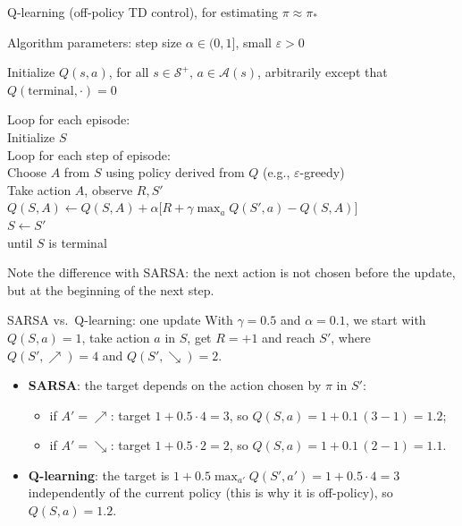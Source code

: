\begin{algobox}{Q-learning (off-policy TD control), for estimating $\pi \approx \pi_*$}
\raggedright
Algorithm parameters: step size $\alpha \in (0,1]$, small $\varepsilon > 0$

\medskip
Initialize $Q(s,a)$, for all $s \in \mathcal{S}^+,\, a \in \mathcal{A}(s)$, arbitrarily except that $Q(\text{terminal},\cdot) = 0$

\medskip
Loop for each episode:\\
\hspace*{1.5em}Initialize $S$\\
\hspace*{1.5em}Loop for each step of episode:\\
\hspace*{3em}Choose $A$ from $S$ using policy derived from $Q$ (e.g., $\varepsilon$-greedy)\\
\hspace*{3em}Take action $A$, observe $R, S'$\\
\hspace*{3em}$Q(S,A) \leftarrow Q(S,A) + \alpha \bigl[R + \gamma \max_a Q(S',a) - Q(S,A)\bigr]$\\
\hspace*{3em}$S \leftarrow S'$\\
\hspace*{1.5em}until $S$ is terminal
\end{algobox}
Note the difference with SARSA: the next action is not chosen before the update, but at the beginning of the next step.

\begin{esempio}{SARSA vs.\ Q-learning: one update}
With $\gamma=0.5$ and $\alpha=0.1$, we start with $Q(S,a)=1$, take action $a$ in $S$, get $R=+1$ and reach $S'$, where $Q(S',\nearrow)=4$ and $Q(S',\searrow)=2$.
\begin{itemize}
    \item \textbf{SARSA}: the target depends on the action chosen by $\pi$ in $S'$:
    \begin{itemize}
        \item if $A'=\nearrow$: target $1+0.5\cdot 4=3$, so $Q(S,a)=1+0.1\,(3-1)=1.2$;
        \item if $A'=\searrow$: target $1+0.5\cdot 2=2$, so $Q(S,a)=1+0.1\,(2-1)=1.1$.
    \end{itemize}
    \item \textbf{Q-learning}: the target is $1+0.5\max_{a'}Q(S',a')=1+0.5\cdot4=3$ independently of the current policy (this is why it is off-policy), so $Q(S,a)=1.2$.
\end{itemize}
\end{esempio}

